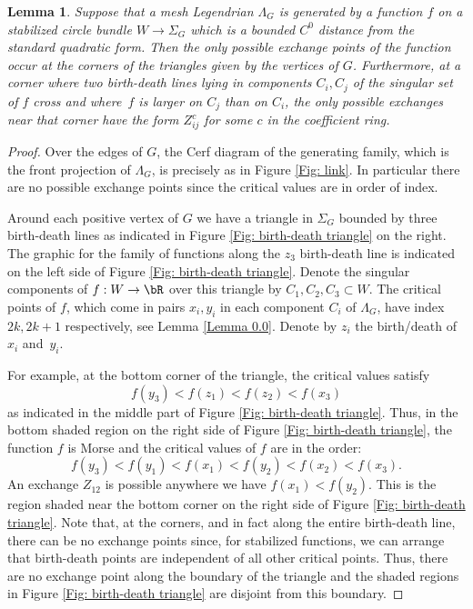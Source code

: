 \documentclass[JEP,XML,SOM,Unicode,NoFloatCountersInSection]{cedram}
\theoremstyle{plain}
\newtheorem{lemma}[theorem]{Lemma}
\theoremstyle{definition}
\begin{document}
\begin{lemma}\label{possible exchange points}
Suppose that a mesh Legendrian $\Lambda_G$ is generated by a function $f$ on a stabilized circle bundle $W \to \Sigma_G$ which is a bounded $C^0$ distance from the standard quadratic form. Then the only possible exchange points of the function occur at the corners of the triangles given by the vertices of $G$. Furthermore, at a corner where two birth-death lines lying in components $C_i,C_j$ of the singular set of $f$ cross and where~$f$ is larger on $C_j$ than on $C_i$, the only possible exchanges near that corner have the form $Z_{ij}^c$ for some $c$ in the coefficient ring.
\end{lemma}

\begin{proof}
Over the edges of $G$, the Cerf diagram of the generating family, which is the front projection of $\Lambda_G$, is precisely as in Figure \ref{Fig: link}. In particular there are no possible exchange points since the critical values are in order of index.

Around each positive vertex of $G$ we have a triangle in $\Sigma_G$ bounded by three birth-death lines as indicated in Figure \ref{Fig: birth-death triangle} on the right. The graphic for the family of functions along the $z_3$ birth-death line is indicated on the left side of Figure \ref{Fig: birth-death triangle}. Denote the singular components of $f:W \to \bR$ over this triangle by $C_1,C_2,C_3 \subset W$. The critical points of $f$, which come in pairs $x_i,y_i$ in each component $C_i$ of $\Lambda_G$, have index $2k, 2k+1$ respectively, see Lemma \ref{Lemma 0.0}. Denote by $z_i$ the birth/death of~$x_i$ and~$y_i$.

For example, at the bottom corner of the triangle, the critical values satisfy
\[
f(y_3)<f(z_1)<f(z_2)<f(x_3)
\]
as indicated in the middle part of Figure \ref{Fig: birth-death triangle}. Thus, in the bottom shaded region on the right side of Figure \ref{Fig: birth-death triangle}, the function $f$ is Morse and the critical values of $f$ are in the order:
\[
f(y_3)< f(y_1)< \boxed{f(x_1)< f(y_2)}<f(x_2)<f(x_3).
\]
An exchange $Z_{12}$ is possible anywhere we have $f(x_1)<f(y_2)$. This is the region shaded near the bottom corner on the right side of Figure \ref{Fig: birth-death triangle}. Note that, at the corners, and in fact along the entire birth-death line, there can be no exchange points since, for stabilized functions, we can arrange that birth-death points are independent of all other critical points. Thus, there are no exchange point along the boundary of the triangle and the shaded regions in Figure \ref{Fig: birth-death triangle} are disjoint from this boundary.


\end{proof}
\end{document}
